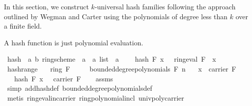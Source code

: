 \begin{isabellebody}
\begin{isamarkuptext}
In this section, we construct $k$-universal hash families following the approach outlined
by Wegman and Carter using the polynomials of degree less than $k$ over a finite field.%
\end{isamarkuptext}\isamarkuptrue%
%
\begin{isamarkuptext}%
A hash function is just polynomial evaluation.%
\end{isamarkuptext}\isamarkuptrue%
\isamarkupfalse%
\ hash\ {\isacharcolon}{\kern0pt}{\isacharcolon}{\kern0pt}\ {\isachardoublequoteopen}{\isacharparenleft}{\kern0pt}{\isacharprime}{\kern0pt}a{\isacharcomma}{\kern0pt}\ {\isacharprime}{\kern0pt}b{\isacharparenright}{\kern0pt}\ ring{\isacharunderscore}{\kern0pt}scheme\ {\isasymRightarrow}\ {\isacharprime}{\kern0pt}a\ {\isasymRightarrow}\ {\isacharprime}{\kern0pt}a\ list\ {\isasymRightarrow}\ {\isacharprime}{\kern0pt}a{\isachardoublequoteclose}\ \isanewline
\ \ \ {\isachardoublequoteopen}hash\ F\ x\ {\isasymomega}\ {\isacharequal}{\kern0pt}\ ring{\isachardot}{\kern0pt}eval\ F\ {\isasymomega}\ x{\isachardoublequoteclose}\isanewline
\isanewline
{}\isamarkupfalse%
\ hash{\isacharunderscore}{\kern0pt}range{\isacharcolon}{\kern0pt}\isanewline
\ \ \ {\isachardoublequoteopen}ring\ F{\isachardoublequoteclose}\isanewline
\ \ \ {\isachardoublequoteopen}{\isasymomega}\ {\isasymin}\ bounded{\isacharunderscore}{\kern0pt}degree{\isacharunderscore}{\kern0pt}polynomials\ F\ n{\isachardoublequoteclose}\isanewline
\ \ \ {\isachardoublequoteopen}x\ {\isasymin}\ carrier\ F{\isachardoublequoteclose}\isanewline
\ \ \ {\isachardoublequoteopen}hash\ F\ x\ {\isasymomega}\ {\isasymin}\ carrier\ F{\isachardoublequoteclose}\isanewline
%
\isadelimproof
\ \ %
\endisadelimproof
%
\isatagproof
{}\isamarkupfalse%
\ assms\ \isanewline
\ \ \isamarkupfalse%
\ {\isacharparenleft}{\kern0pt}simp\ add{\isacharcolon}{\kern0pt}hash{\isacharunderscore}{\kern0pt}def\ bounded{\isacharunderscore}{\kern0pt}degree{\isacharunderscore}{\kern0pt}polynomials{\isacharunderscore}{\kern0pt}def{\isacharparenright}{\kern0pt}\isanewline
\ \ \isamarkupfalse%
\ {\isacharparenleft}{\kern0pt}metis\ ring{\isachardot}{\kern0pt}eval{\isacharunderscore}{\kern0pt}in{\isacharunderscore}{\kern0pt}carrier\ ring{\isachardot}{\kern0pt}polynomial{\isacharunderscore}{\kern0pt}incl\ univ{\isacharunderscore}{\kern0pt}poly{\isacharunderscore}{\kern0pt}carrier{\isacharparenright}{\kern0pt}%
\endisatagproof

\end{isabellebody}
